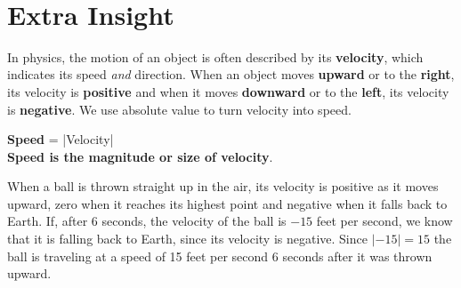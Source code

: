 \documentclass{ximera}[font=12pt]
\begin{document}
\newpage

~ \\[2em]

\insightIcon

\section*{Extra Insight}

In physics, the motion of an object is often described by its \textbf{velocity}, which indicates its speed \emph{and} direction.  
When an object moves \textbf{upward} or to the \textbf{right}, its velocity is \textbf{positive} and when it moves 
\textbf{downward} or to the \textbf{left}, its velocity is \textbf{negative}.  We use
absolute value to turn velocity into speed.

\begin{center}
\textbf{Speed} = |Velocity|  \\

\textbf{Speed is the magnitude or size of velocity}. 
\end{center}


When a ball is thrown straight up in the air, its velocity is positive as it moves upward, zero when it reaches its highest point and negative when
it falls back to Earth.  If, after 6 seconds, the velocity of the ball is $-15$ feet per second, we know that it is falling back to Earth,
since its velocity is negative.  Since $|-15| = 15$ the ball is traveling at a speed of 15 feet per second 6 seconds after it was thrown upward.


\begin{center}
\end{center}
\end{document}
